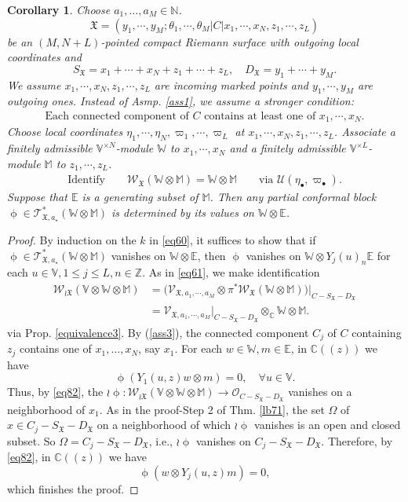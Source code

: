 \documentclass[11pt,b5paper,notitlepage]{article}
\theoremstyle{definition}
\theoremstyle{plain}
\newtheorem{co}[df]{Corollary}
\newcommand{\fk}{\mathfrak}
\newcommand{\mc}{\mathcal}
\newcommand{\SV}{\mathscr{V}}
\newcommand{\scr}{\mathscr}
\newcommand{\SX}{{S_{\fk X}}}
\newcommand{\DX}{D_{\fk X}}
\newcommand{\blt}{\bullet}
\newcommand{\Vbb}{\mathbb V}
\newcommand{\Wbb}{\mathbb W}
\newcommand{\Mbb}{\mathbb M}
\newcommand{\Cbb}{\mathbb C}
\newcommand{\Nbb}{\mathbb N}
\newcommand{\Zbb}{\mathbb Z}
\newcommand{\Ebb}{\mathbb E}
\newcommand{\<}{\left\langle}
\renewcommand{\>}{\right\rangle}
\newcommand{\MU}{\mathcal{U}}
\newcommand{\fx}{\mathfrak{X}}
\newcommand{\SW}{\mathscr{W}}
\numberwithin{equation}{subsection}
\begin{document}
\begin{co}\label{propagation3}
Choose $a_1,\dots,a_M\in\Nbb$.
$$
\fx=(y_1,\cdots,y_M;\theta_1,\cdots,\theta_M\big|C\big| x_1,\cdots,x_N,z_1,\cdots,z_L)
$$
be an $(M,N+L)$-pointed compact Riemann surface with outgoing local coordinates and 
$$
S_\fx=x_1+\cdots+x_N+z_1+\cdots+z_L,\quad D_\fx=y_1+\cdots+y_M.
$$
We assume $x_1,\cdots,x_N,z_1,\cdots,z_L$ are incoming marked points and $y_1,\cdots,y_M$ are outgoing ones. Instead of Asmp. \ref{ass1}, we assume a stronger condition:
\begin{align}\label{ass3}
\text{Each connected component of $C$ contains at least one of $x_1,\cdots,x_N$.}
\end{align}
Choose local coordinates $\eta_1,\cdots,\eta_N,\varpi_1,\cdots,\varpi_L$ at $x_1,\cdots,x_N,z_1,\cdots,z_L$. Associate a finitely admissible $\Vbb^{\times N}$-module $\Wbb$ to $x_1,\cdots,x_N$ and a finitely admissible $\Vbb^{\times L}$-module $\Mbb$ to $z_1,\cdots,z_L$. 
\begin{align*}
\text{Identify}\qquad\SW_\fx(\Wbb\otimes \Mbb)=\Wbb\otimes \Mbb\qquad \text{via }\MU(\eta_\blt,\varpi_\blt).
\end{align*}
Suppose that $\Ebb$ is a generating subset of $\Mbb$. Then any partial conformal block $\upphi\in\scr T_{\fk X,a_\star}^*(\Wbb\otimes\Mbb)$ is determined by its values on $\Wbb\otimes \Ebb$.
\end{co}


\begin{proof}
By induction on the $k$ in \eqref{eq60}, it suffices to show that    if $\upphi\in\scr T_{\fk X,a_\star}^*(\Wbb\otimes\Mbb)$ vanishes on $\Wbb\otimes \Ebb$, then $\upphi$ vanishes on $\Wbb\otimes Y_j(u)_n \Ebb$ for each $u\in \Vbb, 1\leq j\leq L,n\in \Zbb$.  As in \eqref{eq61}, we make identification
$$
\begin{aligned}
 \SW_{\wr\fx}(\Vbb\otimes \Wbb\otimes \Mbb)&=\big(\SV_{\fx,a_1,\cdots,a_M}\otimes \pi^*\SW_\fx(\Wbb\otimes \Mbb)\big)\vert_{C-S_\fx-D_\fx}\\
 &=\SV_{\fx,a_1,\cdots,a_M}\vert_{C-S_\fx-D_\fx}\otimes_\Cbb \Wbb\otimes \Mbb.
 \end{aligned}
$$
via Prop. \ref{equivalence3}. By (\ref{ass3}),  the connected component $C_j$ of $C$ containing $z_j$ contains one of $x_1,\dots,x_N$, say $x_1$. For each $w\in \Wbb,m\in \Ebb$, in $\Cbb((z))$ we have
$$
\upphi(Y_1(u,z)w\otimes m)=0,\quad \forall u\in \Vbb.
$$
Thus, by \eqref{eq82}, the $\wr\upphi:\scr W_{\wr\fk X}(\Vbb\otimes\Wbb\otimes\Mbb)\rightarrow\mc O_{C-\SX-\DX}$ vanishes on a neighborhood of $x_1$. As in the proof-Step 2 of Thm. \ref{lb71}, the set $\Omega$ of $x\in C_j-\SX-\DX$ on a neighborhood of which $\wr\upphi$ vanishes is an open and closed subset. So $\Omega=C_j-\SX-\DX$, i.e., $\wr\upphi$ vanishes on $C_j-\SX-\DX$. Therefore, by \eqref{eq82}, in $\Cbb((z))$ we have
$$
\upphi(w\otimes Y_j(u,z)m)=0,
$$
which finishes the proof.
\end{proof}
\end{document}
